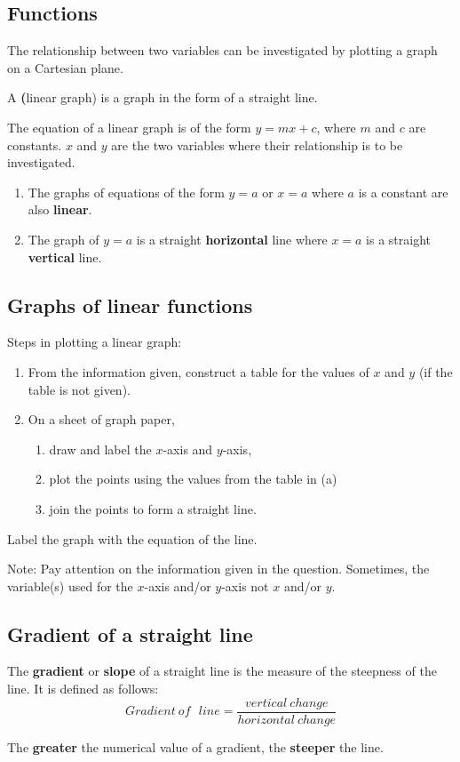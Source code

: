 \documentclass[../main]{subfiles}
\begin{document}
\subsection{Functions}
The relationship between two variables can be investigated by plotting a graph
on a Cartesian plane.

A \textbf(linear graph) is a graph in the form of a straight line.

The equation of a linear graph is of the form \(y=mx +c\), where \(m\) and \(c\)
are constants. \(x\) and \(y\) are the two variables where their relationship is
to be investigated.
\begin{enumerate}
\item  The graphs of equations of the form \(y=a\) or \(x =a\) where $a$ is a
  constant are also \textbf{linear}.
 
\item The graph of \(y=a\) is a straight \textbf{horizontal} line where \(x=a\)
  is a straight \textbf{vertical} line.
\end{enumerate}

\subsection{Graphs of linear functions}
Steps in plotting a linear graph:
\begin{enumerate}[label=(\alph*)]
\item From the information given, construct a table for the values of $x$ and
  $y$ (if the table is not given).
 
\item On a sheet of graph paper, 
  \begin{enumerate}[label=(\roman*)]
  \item draw and label the $x$-axis and $y$-axis,
  \item plot the points using the values from the table in (a)
  \item join the points to form a straight line. 
  \end{enumerate}
\end{enumerate}
\item Label the graph with the equation of the line.

Note: Pay attention on the information given in the question. Sometimes, the
variable(s) used for the $x$-axis and/or $y$-axis not $x$ and/or $y$.

\subsection{Gradient of a straight line}

The \textbf{gradient} or \textbf{slope} of a straight line is the measure of the
steepness of the line. It is defined as follows:
\[{Gradient\ of\ \ \ line}={\frac {vertical\ change} {horizontal\ change}}\]

The \textbf{greater} the numerical value of a gradient, the \textbf{steeper} the line.


  
\end{document}
